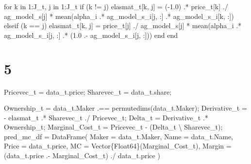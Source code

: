 \documentclass[
  letterpaper,
  DIV=11,
  numbers=noendperiod]{scrreprt}
\newenvironment{Shaded}{\begin{snugshade}}{\end{snugshade}}
\newcommand{\ControlFlowTok}[1]{\textcolor[rgb]{0.00,0.23,0.31}{#1}}
\newcommand{\DataTypeTok}[1]{\textcolor[rgb]{0.68,0.00,0.00}{#1}}
\newcommand{\FloatTok}[1]{\textcolor[rgb]{0.68,0.00,0.00}{#1}}
\newcommand{\FunctionTok}[1]{\textcolor[rgb]{0.28,0.35,0.67}{#1}}
\newcommand{\KeywordTok}[1]{\textcolor[rgb]{0.00,0.23,0.31}{#1}}
\newcommand{\NormalTok}[1]{\textcolor[rgb]{0.00,0.23,0.31}{#1}}
\newcommand{\OperatorTok}[1]{\textcolor[rgb]{0.37,0.37,0.37}{#1}}
\begin{document}
\begin{Shaded}
\begin{Highlighting}[]
\ControlFlowTok{for}\NormalTok{ k }\KeywordTok{in} \FloatTok{1}\OperatorTok{:}\NormalTok{J\_t, j }\KeywordTok{in} \FloatTok{1}\OperatorTok{:}\NormalTok{J\_t}
    \ControlFlowTok{if}\NormalTok{ (k }\OperatorTok{!=}\NormalTok{ j)}
\NormalTok{        elasmat\_t[k, j] }\OperatorTok{=}\NormalTok{ (}\OperatorTok{{-}}\FloatTok{1.0}\NormalTok{) }\OperatorTok{.*}\NormalTok{ price\_t[k] }\OperatorTok{./}\NormalTok{ ag\_model\_s[j] }\OperatorTok{*} \FunctionTok{mean}\NormalTok{(alpha\_i }\OperatorTok{.*}\NormalTok{ ag\_model\_s\_i[j, }\OperatorTok{:}\NormalTok{] }\OperatorTok{.*}\NormalTok{ ag\_model\_s\_i[k, }\OperatorTok{:}\NormalTok{])}
    \ControlFlowTok{elseif}\NormalTok{ (k }\OperatorTok{==}\NormalTok{ j)}
\NormalTok{        elasmat\_t[k, j] }\OperatorTok{=}\NormalTok{ price\_t[j] }\OperatorTok{./}\NormalTok{ ag\_model\_s[j] }\OperatorTok{*} \FunctionTok{mean}\NormalTok{(alpha\_i }\OperatorTok{.*}\NormalTok{ ag\_model\_s\_i[j, }\OperatorTok{:}\NormalTok{] }\OperatorTok{.*}\NormalTok{ (}\FloatTok{1.0} \OperatorTok{.{-}}\NormalTok{ ag\_model\_s\_i[j, }\OperatorTok{:}\NormalTok{]))}
    \ControlFlowTok{end}
\ControlFlowTok{end}
\end{Highlighting}
\end{Shaded}

\hypertarget{section-9}{%
\section{5}\label{section-9}}

\begin{Shaded}
\begin{Highlighting}[]
\NormalTok{Pricevec\_t }\OperatorTok{=}\NormalTok{ data\_t.price;}
\NormalTok{Sharevec\_t }\OperatorTok{=}\NormalTok{ data\_t.share;}

\NormalTok{Ownership\_t }\OperatorTok{=}\NormalTok{ data\_t.Maker }\OperatorTok{.==} \FunctionTok{permutedims}\NormalTok{(data\_t.Maker);}
\NormalTok{Derivative\_t }\OperatorTok{=} \OperatorTok{{-}}\NormalTok{ elasmat\_t }\OperatorTok{.*}\NormalTok{ Sharevec\_t}\OperatorTok{\textquotesingle{}} \OperatorTok{./}\NormalTok{ Pricevec\_t;}
\NormalTok{Delta\_t }\OperatorTok{=}\NormalTok{ Derivative\_t }\OperatorTok{.*}\NormalTok{ Ownership\_t;}
\NormalTok{Marginal\_Cost\_t }\OperatorTok{=}\NormalTok{ Pricevec\_t }\OperatorTok{{-}}\NormalTok{ (Delta\_t }\OperatorTok{\textbackslash{}}\NormalTok{ Sharevec\_t);}
\NormalTok{pred\_mc\_df }\OperatorTok{=} \FunctionTok{DataFrame}\NormalTok{(}
\NormalTok{    Maker }\OperatorTok{=}\NormalTok{ data\_t.Maker, }
\NormalTok{    Name }\OperatorTok{=}\NormalTok{ data\_t.Name, }
\NormalTok{    Price }\OperatorTok{=}\NormalTok{ data\_t.price,}
\NormalTok{    MC }\OperatorTok{=} \FunctionTok{Vector}\DataTypeTok{\{Float64\}}\NormalTok{(Marginal\_Cost\_t),}
\NormalTok{    Margin }\OperatorTok{=}\NormalTok{ (data\_t.price }\OperatorTok{.{-}}\NormalTok{ Marginal\_Cost\_t) }\OperatorTok{./}\NormalTok{ data\_t.price}
\NormalTok{)}
\end{Highlighting}
\end{Shaded}
\end{document}
